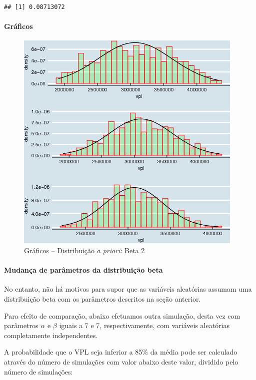 \documentclass[a4paper]{article}
\let\oldparagraph\paragraph
\renewcommand{\paragraph}[1]{\oldparagraph{#1}\mbox{}}
\begin{document}
\begin{verbatim}
## [1] 0.08713072
\end{verbatim}

\paragraph{Gráficos}\label{graficos-1}

\begin{figure}[H]

{\centering \includegraphics[width=0.7\linewidth]{images/histogramasbeta-1} 

}

\caption{Gráficos -- Distribuição \emph{a priori}: Beta 2}\label{fig:histogramasbeta}
\end{figure}

\paragraph{Mudança de parâmetros da distribuição
beta}\label{mudanca-de-parametros-da-distribuicao-beta}

No entanto, não há motivos para supor que as variáveis aleatórias
assumam uma distribuição beta com os parâmetros descritos na seção
anterior.

Para efeito de comparação, abaixo efetuamos outra simulação, desta vez
com parâmetros \(\alpha\) e \(\beta\) iguais a 7 e 7, respectivamente,
com variáveis aleatórias completamente independentes.

A probabilidade que o VPL seja inferior a 85\% da média pode ser
calculado através do número de simulações com valor abaixo deste valor,
dividido pelo número de simulações:
\end{document}
